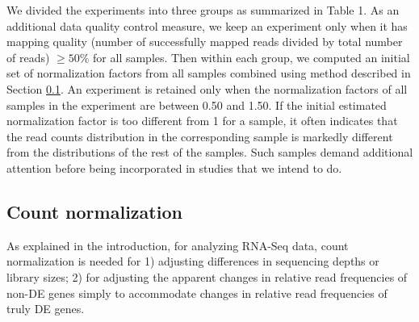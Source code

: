 	
	
	We divided the experiments into three groups as summarized in Table 1.  As an
	additional data quality control measure,  we keep an experiment only when it has mapping quality (number of successfully mapped reads divided by total number of reads) $\geq 50\%$ for all samples.
	Then within each group, we computed an
	initial set of normalization factors from all samples combined using method
	described in Section \ref{section:countNormalization}.  An experiment is
	retained only when the normalization factors of all samples in the experiment
	are between 0.50 and 1.50.  If the initial estimated normalization factor is
	too different from 1 for a sample, it often indicates that the read counts
	distribution in the corresponding sample is markedly different from the
	distributions of the rest of the samples. Such samples demand additional
	attention before being incorporated in studies that we intend to do.
	
	
	
	\subsection{Count normalization}\label{section:countNormalization}
	As explained in the introduction, for analyzing RNA-Seq data, count
	normalization is needed for 1) adjusting differences in sequencing depths or
	library sizes; 2) for adjusting the apparent changes in relative read
	frequencies of non-DE genes simply to accommodate changes in relative read
	frequencies of truly DE genes.
	
